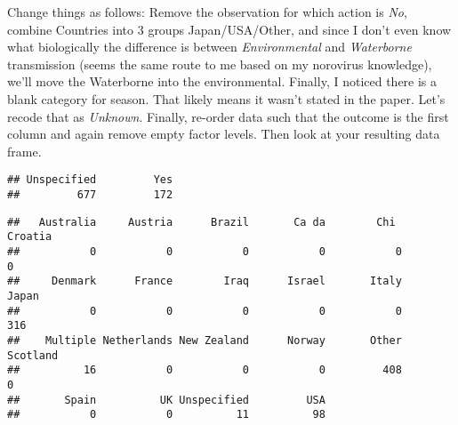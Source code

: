 \documentclass[]{article}
\newenvironment{Shaded}{\begin{snugshade}}{\end{snugshade}}
\newcommand{\CommentTok}[1]{\textcolor[rgb]{0.56,0.35,0.01}{\textit{#1}}}
\newcommand{\KeywordTok}[1]{\textcolor[rgb]{0.13,0.29,0.53}{\textbf{#1}}}
\newcommand{\NormalTok}[1]{#1}
\newcommand{\OperatorTok}[1]{\textcolor[rgb]{0.81,0.36,0.00}{\textbf{#1}}}
\newcommand{\StringTok}[1]{\textcolor[rgb]{0.31,0.60,0.02}{#1}}
\begin{document}
Change things as follows: Remove the observation for which action is
\emph{No}, combine Countries into 3 groups Japan/USA/Other, and since I
don't even know what biologically the difference is between
\emph{Environmental} and \emph{Waterborne} transmission (seems the same
route to me based on my norovirus knowledge), we'll move the Waterborne
into the environmental. Finally, I noticed there is a blank category for
season. That likely means it wasn't stated in the paper. Let's recode
that as \emph{Unknown}. Finally, re-order data such that the outcome is
the first column and again remove empty factor levels. Then look at your
resulting data frame.

\begin{Shaded}
\end{Shaded}

\begin{verbatim}
## Unspecified         Yes 
##         677         172
\end{verbatim}

\begin{Shaded}
\end{Shaded}

\begin{verbatim}
##   Australia     Austria      Brazil       Ca da        Chi      Croatia 
##           0           0           0           0           0           0 
##     Denmark      France        Iraq      Israel       Italy       Japan 
##           0           0           0           0           0         316 
##    Multiple Netherlands New Zealand      Norway       Other    Scotland 
##          16           0           0           0         408           0 
##       Spain          UK Unspecified         USA 
##           0           0          11          98
\end{verbatim}
\end{document}
